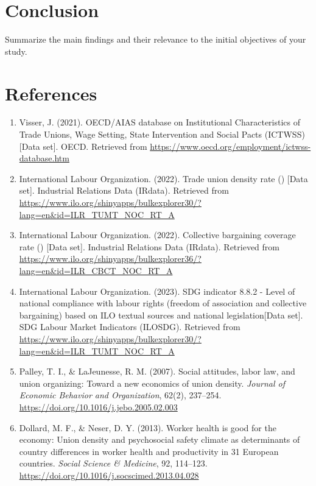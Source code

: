\documentclass[11pt]{article}\usepackage[]{graphicx}\usepackage[]{xcolor}
\begin{document}
\clearpage
\section{Conclusion}
Summarize the main findings and their relevance to the initial objectives of your study.

\clearpage

\section*{References}
\begin{enumerate}
  \item Visser, J. (2021). OECD/AIAS database on Institutional Characteristics of Trade Unions, Wage Setting, State Intervention and Social Pacts (ICTWSS) [Data set]. OECD. Retrieved from \url{https://www.oecd.org/employment/ictwss-database.htm}
  
  \item International Labour Organization. (2022). Trade union density rate () [Data set]. Industrial Relations Data (IRdata). Retrieved from \url{https://www.ilo.org/shinyapps/bulkexplorer30/?lang=en\&id=ILR\_TUMT\_NOC\_RT\_A}
  
  \item International Labour Organization. (2022). Collective bargaining coverage rate () [Data set]. Industrial Relations Data (IRdata). Retrieved from \url{https://www.ilo.org/shinyapps/bulkexplorer36/?lang=en\&id=ILR\_CBCT\_NOC\_RT\_A}
  
  \item International Labour Organization. (2023). SDG indicator 8.8.2 - Level of national compliance with labour rights (freedom of association and collective bargaining) based on ILO textual sources and national legislation[Data set]. SDG Labour Market Indicators (ILOSDG). Retrieved from \url{https://www.ilo.org/shinyapps/bulkexplorer30/?lang=en\&id=ILR\_TUMT\_NOC\_RT\_A}
  
  \item Palley, T. I., \& LaJeunesse, R. M. (2007). Social attitudes, labor law, and union organizing: Toward a new economics of union density. \textit{Journal of Economic Behavior and Organization}, 62(2), 237–254. \url{https://doi.org/10.1016/j.jebo.2005.02.003}
  
  \item Dollard, M. F., \& Neser, D. Y. (2013). Worker health is good for the economy: Union density and psychosocial safety climate as determinants of country differences in worker health and productivity in 31 European countries. \textit{Social Science \& Medicine}, 92, 114–123. \url{https://doi.org/10.1016/j.socscimed.2013.04.028}
  

\end{enumerate}
\end{document}
